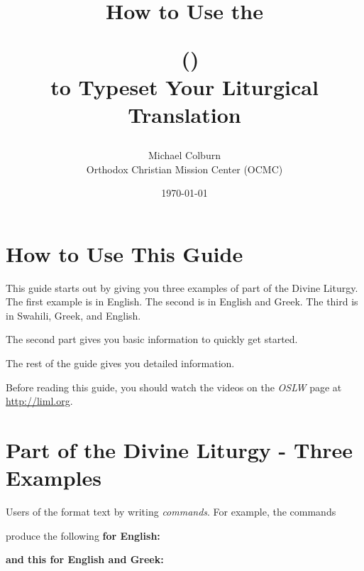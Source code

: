 \documentclass[]{memoir}
\title{How to Use the\\\bigskip

\ltOcmcSystem\   (\ltOcmcSystemAcronymn) \\\bigskip
to Typeset Your Liturgical Translation}
\author{Michael Colburn\\Orthodox Christian Mission Center (OCMC)}
\date{\today}
\begin{document}
\maketitle
\tableofcontents

\vfill

\pagebreak


\chapter{How to Use This Guide}

This guide starts out by giving you three examples of part of the Divine Liturgy.  The first example is in English.  The second is in English and Greek.  The third is in Swahili, Greek, and English.  

The second part gives you basic information to quickly get started.

The rest of the guide gives you detailed information.

Before reading this guide, you should watch the videos on the \emph{OSLW} page at \url{http://liml.org}.

\chapter{Part of the Divine Liturgy - Three Examples}

Users of the \ltOcmcSystem{} format text by writing \emph{commands}. For example, the commands

\begin{ltDocBlock}[ex1]
\end{ltDocBlock}

\begin{ltDocBlock}[ex2]
\end{ltDocBlock}

produce the following \textbf{for English:}
\small



\ltColumnsOn
\textbf{and this for English and Greek:}

\end{document}
